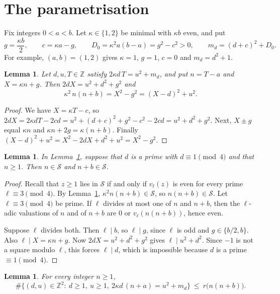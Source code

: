 \documentclass[11pt]{amsart}
\newtheorem{lemma}[theorem]{Lemma}
\theoremstyle{remark}
\theoremstyle{definition}
\numberwithin{equation}{section}
\newcommand{\Sc}{\mathcal{S}}
\newcommand{\Z}{\mathbb{Z}}
\begin{document}
\section{The parametrisation}\label{sec:param}

Fix integers $0<a<b$. Let $\kappa\in\{1,2\}$ be minimal with $\kappa b$ even, and put
\begin{equation}\label{eq:params}
g=\frac{\kappa b}{2},\qquad c=\kappa a-g,\qquad D_0=\kappa^2a(b-a)=g^2-c^2>0,\qquad m_d=(d+c)^2+D_0 .
\end{equation}
For example, $(a,b)=(1,2)$ gives $\kappa=1$, $g=1$, $c=0$ and $m_d=d^2+1$.

\begin{lemma}\label{lem:identity}
Let $d,u,T\in\Z$ satisfy $2\kappa d\,T=u^2+m_d$, and put $n=T-a$ and $X=\kappa n+g$. Then $2dX=u^2+d^2+g^2$ and
\[
\kappa^2\,n(n+b)=X^2-g^2=(X-d)^2+u^2 .
\]
\end{lemma}

\begin{proof}
We have $X=\kappa T-c$, so $2dX=2\kappa dT-2cd=u^2+(d+c)^2+g^2-c^2-2cd=u^2+d^2+g^2$. Next, $X\pm g$ equal $\kappa n$ and $\kappa n+2g=\kappa(n+b)$. Finally $(X-d)^2+u^2=X^2-2dX+d^2+u^2=X^2-g^2$.
\end{proof}

\begin{lemma}\label{lem:split}
In Lemma~\ref{lem:identity}, suppose that $d$ is a prime with $d\equiv1\pmod4$ and that $n\ge1$. Then $n\in\Sc$ and $n+b\in\Sc$.
\end{lemma}

\begin{proof}
Recall that $z\ge1$ lies in $\Sc$ if and only if $v_\ell(z)$ is even for every prime $\ell\equiv3\pmod 4$. By Lemma~\ref{lem:identity}, $\kappa^2n(n+b)\in\Sc$, so $n(n+b)\in\Sc$. Let $\ell\equiv3\pmod 4$ be prime. If $\ell$ divides at most one of $n$ and $n+b$, then the $\ell$-adic valuations of $n$ and of $n+b$ are $0$ or $v_\ell(n(n+b))$, hence even.

Suppose $\ell$ divides both. Then $\ell\mid b$, so $\ell\mid g$, since $\ell$ is odd and $g\in\{b/2,b\}$. Also $\ell\mid X=\kappa n+g$. Now $2dX=u^2+d^2+g^2$ gives $\ell\mid u^2+d^2$. Since $-1$ is not a square modulo $\ell$, this forces $\ell\mid d$, which is impossible because $d$ is a prime $\equiv1\pmod 4$.
\end{proof}

\begin{lemma}\label{lem:mult}
For every integer $n\ge1$,
\[
\#\bigl\{(d,u)\in\Z^2:\ d\ge1,\ u\ge1,\ 2\kappa d\,(n+a)=u^2+m_d\bigr\}\ \le\ r\bigl(n(n+b)\bigr).
\]
\end{lemma}
\end{document}
